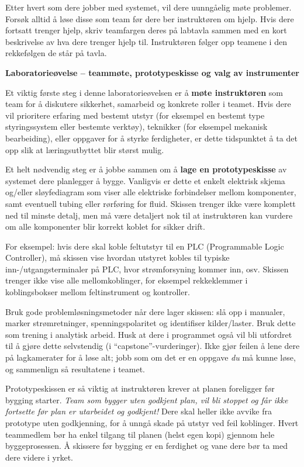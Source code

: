 Etter hvert som dere jobber med systemet, vil dere uunngåelig møte problemer. Forsøk alltid å løse disse som team før dere ber instruktøren om hjelp. Hvis dere fortsatt trenger hjelp, skriv teamfargen deres på labtavla sammen med en kort beskrivelse av hva dere trenger hjelp til. Instruktøren følger opp teamene i den rekkefølgen de står på tavla.




\vfil \eject

\noindent
{\bf Laboratorieøvelse -- teammøte, prototypeskisse og valg av instrumenter}

\vskip 5pt

Et viktig første steg i denne laboratorieøvelsen er å {\bf møte instruktøren} som team for å diskutere sikkerhet, samarbeid og konkrete roller i teamet. Hvis dere vil prioritere erfaring med bestemt utstyr (for eksempel en bestemt type styringssystem eller bestemte verktøy), teknikker (for eksempel mekanisk bearbeiding), eller oppgaver for å styrke ferdigheter, er dette tidspunktet å ta det opp slik at læringsutbyttet blir størst mulig.

\vskip 10pt

Et helt nødvendig steg er å jobbe sammen om å {\bf lage en prototypeskisse} av systemet dere planlegger å bygge. Vanligvis er dette et enkelt elektrisk skjema og/eller sløyfediagram som viser alle elektriske forbindelser mellom komponenter, samt eventuell tubing eller rørføring for fluid. Skissen trenger ikke være komplett ned til minste detalj, men må være detaljert nok til at instruktøren kan vurdere om alle komponenter blir korrekt koblet for sikker drift.

For eksempel: hvis dere skal koble feltutstyr til en PLC (Programmable Logic Controller), må skissen vise hvordan utstyret kobles til typiske inn-/utgangsterminaler på PLC, hvor strømforsyning kommer inn, osv. Skissen trenger ikke vise alle mellomkoblinger, for eksempel rekkeklemmer i koblingsbokser mellom feltinstrument og kontroller.

Bruk gode problemløsningsmetoder når dere lager skissen: slå opp i manualer, marker strømretninger, spenningspolaritet og identifiser kilder/laster. Bruk dette som trening i analytisk arbeid. Husk at dere i programmet også vil bli utfordret til å gjøre dette selvstendig (i ``capstone''-vurderinger). Ikke gjør feilen å lene dere på lagkamerater for å løse alt; jobb som om det er en oppgave {\it du} må kunne løse, og sammenlign så resultatene i teamet.

Prototypeskissen er så viktig at instruktøren krever at planen foreligger før bygging starter. {\it Team som bygger uten godkjent plan, vil bli stoppet og får ikke fortsette før plan er utarbeidet og godkjent!} Dere skal heller ikke avvike fra prototype uten godkjenning, for å unngå skade på utstyr ved feil koblinger. Hvert teammedlem bør ha enkel tilgang til planen (helst egen kopi) gjennom hele byggeprosessen. Å skissere før bygging er en ferdighet og vane dere bør ta med dere videre i yrket.

